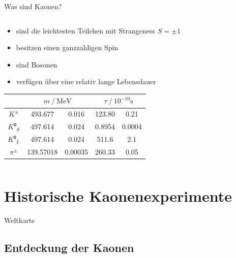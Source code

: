 \documentclass[aspectratio=1610, professionalfonts, 9pt, t]{beamer}
\begin{document}
\begin{frame}{Was sind Kaonen?}
\begin{columns}[onlytextwidth]
\begin{column}{0.5\textwidth}
\begin{itemize}
          \item sind die leichtesten Teilchen mit Strangeness $S = \pm1$
          \item besitzen einen ganzzahligen Spin
          \item sind Bosonen
          \item verfügen über eine relativ lange Lebensdauer
        \end{itemize}
        \begin{table}
          \centering
          \begin{tabular}{
              S[table-format=6.0]
              S[table-format=3.5]
              @{${}\pm{}$}
              S[table-format=1.5]
              S[table-format=3.4]
              @{${}\pm{}$}
              S[table-format=1.4]
            }
              \toprule
              &  &  \\
              \midrule
              $K^{\pm}$   & 493.677 & 0.016 & 123.80 & 0.21 \\
              $K⁰_{S}$    & 497.614 & 0.024 & 0.8954 & 0.0004 \\
              $K⁰_{L}$    & 497.614 & 0.024 & 511.6  & 2.1 \\
              ${\pi}^{\pm}$ & 139.57018 & 0.00035 & 260.33 & 0.05 \\
              \bottomrule
          \end{tabular}
        \end{table}
      \end{column}
    \end{columns}
  \end{frame}

\section{Historische Kaonenexperimente}
  \begin{frame}{Weltkarte}
  \end{frame}

\subsection{Entdeckung der Kaonen}
\end{document}
